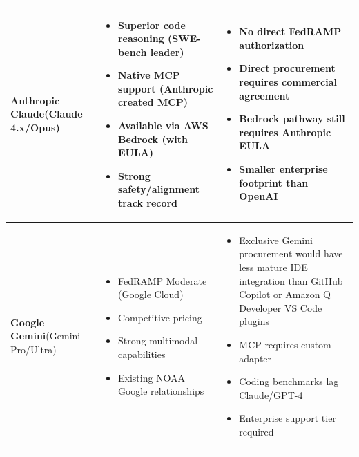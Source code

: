 \documentclass[11pt]{article}
\begin{document}
\begin{longtable}{@{}>{\raggedright}p{2.5cm}|p{5.5cm}|p{5.5cm}@{}}
\textbf{Anthropic Claude}\newline(Claude 4.x/Opus) &
\begin{itemize}[leftmargin=*, itemsep=1pt, topsep=0pt]
    \item Superior code reasoning (SWE-bench leader)
    \item Native MCP support (Anthropic created MCP)
    \item Available via AWS Bedrock (with EULA)
    \item Strong safety/alignment track record
\end{itemize} &
\begin{itemize}[leftmargin=*, itemsep=1pt, topsep=0pt]
    \item \textcolor{conred}{\textbf{No direct FedRAMP authorization}}
    \item Direct procurement requires commercial agreement
    \item Bedrock pathway still requires Anthropic EULA
    \item Smaller enterprise footprint than OpenAI
\end{itemize} \\
\midrule

\textbf{Google Gemini}\newline(Gemini Pro/Ultra) &
\begin{itemize}[leftmargin=*, itemsep=1pt, topsep=0pt]
    \item FedRAMP Moderate (Google Cloud)
    \item Competitive pricing
    \item Strong multimodal capabilities
    \item Existing NOAA Google relationships
\end{itemize} &
\begin{itemize}[leftmargin=*, itemsep=1pt, topsep=0pt]
    \item Exclusive Gemini procurement would have less mature IDE integration than GitHub Copilot or Amazon Q Developer VS Code plugins
    \item MCP requires custom adapter
    \item Coding benchmarks lag Claude/GPT-4
    \item Enterprise support tier required
\end{itemize} \\
\midrule


\end{longtable}
\end{document}
